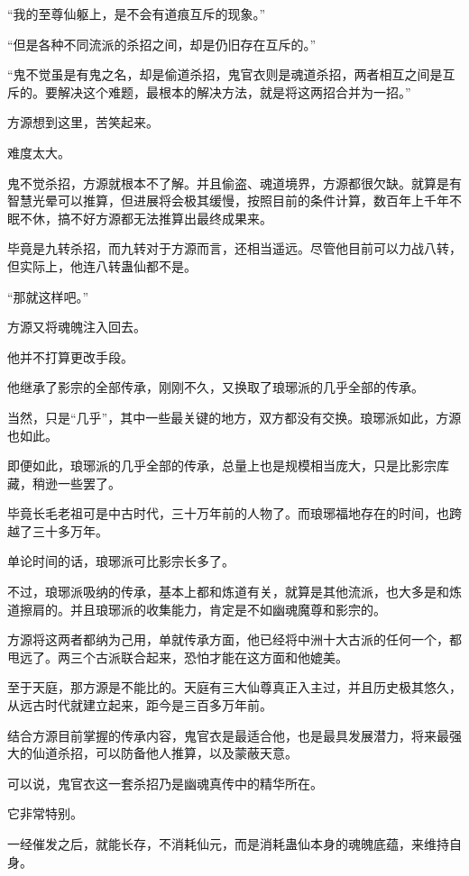 \begin{this_body}
“我的至尊仙躯上，是不会有道痕互斥的现象。”

“但是各种不同流派的杀招之间，却是仍旧存在互斥的。”

“鬼不觉虽是有鬼之名，却是偷道杀招，鬼官衣则是魂道杀招，两者相互之间是互斥的。要解决这个难题，最根本的解决方法，就是将这两招合并为一招。”

方源想到这里，苦笑起来。

难度太大。

鬼不觉杀招，方源就根本不了解。并且偷盗、魂道境界，方源都很欠缺。就算是有智慧光晕可以推算，但进展将会极其缓慢，按照目前的条件计算，数百年上千年不眠不休，搞不好方源都无法推算出最终成果来。

毕竟是九转杀招，而九转对于方源而言，还相当遥远。尽管他目前可以力战八转，但实际上，他连八转蛊仙都不是。

“那就这样吧。”

方源又将魂魄注入回去。

他并不打算更改手段。

他继承了影宗的全部传承，刚刚不久，又换取了琅琊派的几乎全部的传承。

当然，只是“几乎”，其中一些最关键的地方，双方都没有交换。琅琊派如此，方源也如此。

即便如此，琅琊派的几乎全部的传承，总量上也是规模相当庞大，只是比影宗库藏，稍逊一些罢了。

毕竟长毛老祖可是中古时代，三十万年前的人物了。而琅琊福地存在的时间，也跨越了三十多万年。

单论时间的话，琅琊派可比影宗长多了。

不过，琅琊派吸纳的传承，基本上都和炼道有关，就算是其他流派，也大多是和炼道擦肩的。并且琅琊派的收集能力，肯定是不如幽魂魔尊和影宗的。

方源将这两者都纳为己用，单就传承方面，他已经将中洲十大古派的任何一个，都甩远了。两三个古派联合起来，恐怕才能在这方面和他媲美。

至于天庭，那方源是不能比的。天庭有三大仙尊真正入主过，并且历史极其悠久，从远古时代就建立起来，距今是三百多万年前。

结合方源目前掌握的传承内容，鬼官衣是最适合他，也是最具发展潜力，将来最强大的仙道杀招，可以防备他人推算，以及蒙蔽天意。

可以说，鬼官衣这一套杀招乃是幽魂真传中的精华所在。

它非常特别。

一经催发之后，就能长存，不消耗仙元，而是消耗蛊仙本身的魂魄底蕴，来维持自身。


\end{this_body}
